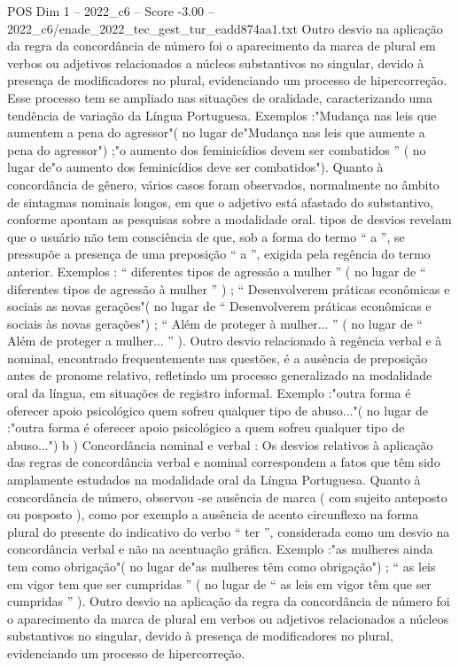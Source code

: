 \begin{textsample}{POS Dim 1 – 2022\_c6 – Score -3.00 – 2022\_c6/enade\_2022\_tec\_gest\_tur\_eadd874aa1.txt}
Outro desvio na aplicação da regra da concordância de número foi o aparecimento da marca de plural em verbos ou adjetivos relacionados a núcleos substantivos no singular, devido à presença de modificadores no plural, evidenciando um processo de hipercorreção.
Esse processo tem se ampliado nas situações de oralidade, caracterizando uma tendência de variação da Língua Portuguesa.
Exemplos :"Mudança nas leis que aumentem a pena do agressor"( no lugar de"Mudança nas leis que aumente a pena do agressor") ;"o aumento dos feminicídios devem ser combatidos ” ( no lugar de"o aumento dos feminicídios deve ser combatidos").
Quanto à concordância de gênero, vários casos foram observados, normalmente no âmbito de sintagmas nominais longos, em que o adjetivo está afastado do substantivo, conforme apontam as pesquisas sobre a modalidade oral. tipos de desvios revelam que o usuário não tem consciência de que, sob a forma do termo “ a ”, se pressupõe a presença de uma preposição “ a ”, exigida pela regência do termo anterior.
Exemplos : “ diferentes tipos de agressão a mulher ” ( no lugar de “ diferentes tipos de agressão à mulher ” ) ; “ Desenvolverem práticas econômicas e sociais as novas gerações"( no lugar de “ Desenvolverem práticas econômicas e sociais às novas gerações") ; “ Além de proteger à mulher... ” ( no lugar de “ Além de proteger a mulher... ” ).
Outro desvio relacionado à regência verbal e à nominal, encontrado frequentemente nas questões, é a ausência de preposição antes de pronome relativo, refletindo um processo generalizado na modalidade oral da língua, em situações de registro informal.
Exemplo :"outra forma é oferecer apoio psicológico quem sofreu qualquer tipo de abuso..."( no lugar de :"outra forma é oferecer apoio psicológico a quem sofreu qualquer tipo de abuso...") b ) Concordância nominal e verbal : Os desvios relativos à aplicação das regras de concordância verbal e nominal correspondem a fatos que têm sido amplamente estudados na modalidade oral da Língua Portuguesa.
Quanto à concordância de número, observou -se ausência de marca ( com sujeito anteposto ou posposto ), como por exemplo a ausência de acento circunflexo na forma plural do presente do indicativo do verbo “ ter ”, considerada como um desvio na concordância verbal e não na acentuação gráfica.
Exemplo :"as mulheres ainda tem como obrigação"( no lugar de"as mulheres têm como obrigação") ; “ as leis em vigor tem que ser cumpridas ” ( no lugar de “ as leis em vigor têm que ser cumpridas ” ).
Outro desvio na aplicação da regra da concordância de número foi o aparecimento da marca de plural em verbos ou adjetivos relacionados a núcleos substantivos no singular, devido à presença de modificadores no plural, evidenciando um processo de hipercorreção.

\end{textsample}
